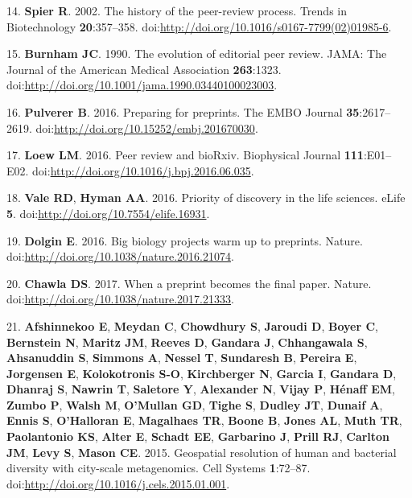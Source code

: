 \documentclass[11pt,]{article}
\begin{document}
14. \textbf{Spier R}. 2002. The history of the peer-review process.
Trends in Biotechnology \textbf{20}:357--358.
doi:\url{http://doi.org/10.1016/s0167-7799(02)01985-6}.

15. \textbf{Burnham JC}. 1990. The evolution of editorial peer review.
JAMA: The Journal of the American Medical Association \textbf{263}:1323.
doi:\url{http://doi.org/10.1001/jama.1990.03440100023003}.

16. \textbf{Pulverer B}. 2016. Preparing for preprints. The EMBO Journal
\textbf{35}:2617--2619.
doi:\url{http://doi.org/10.15252/embj.201670030}.

17. \textbf{Loew LM}. 2016. Peer review and bioRxiv. Biophysical Journal
\textbf{111}:E01--E02.
doi:\url{http://doi.org/10.1016/j.bpj.2016.06.035}.

18. \textbf{Vale RD}, \textbf{Hyman AA}. 2016. Priority of discovery in
the life sciences. eLife \textbf{5}.
doi:\url{http://doi.org/10.7554/elife.16931}.

19. \textbf{Dolgin E}. 2016. Big biology projects warm up to preprints.
Nature. doi:\url{http://doi.org/10.1038/nature.2016.21074}.

20. \textbf{Chawla DS}. 2017. When a preprint becomes the final paper.
Nature. doi:\url{http://doi.org/10.1038/nature.2017.21333}.

21. \textbf{Afshinnekoo E}, \textbf{Meydan C}, \textbf{Chowdhury S},
\textbf{Jaroudi D}, \textbf{Boyer C}, \textbf{Bernstein N},
\textbf{Maritz JM}, \textbf{Reeves D}, \textbf{Gandara J},
\textbf{Chhangawala S}, \textbf{Ahsanuddin S}, \textbf{Simmons A},
\textbf{Nessel T}, \textbf{Sundaresh B}, \textbf{Pereira E},
\textbf{Jorgensen E}, \textbf{Kolokotronis S-O}, \textbf{Kirchberger N},
\textbf{Garcia I}, \textbf{Gandara D}, \textbf{Dhanraj S},
\textbf{Nawrin T}, \textbf{Saletore Y}, \textbf{Alexander N},
\textbf{Vijay P}, \textbf{Hénaff EM}, \textbf{Zumbo P}, \textbf{Walsh
M}, \textbf{O'Mullan GD}, \textbf{Tighe S}, \textbf{Dudley JT},
\textbf{Dunaif A}, \textbf{Ennis S}, \textbf{O'Halloran E},
\textbf{Magalhaes TR}, \textbf{Boone B}, \textbf{Jones AL}, \textbf{Muth
TR}, \textbf{Paolantonio KS}, \textbf{Alter E}, \textbf{Schadt EE},
\textbf{Garbarino J}, \textbf{Prill RJ}, \textbf{Carlton JM},
\textbf{Levy S}, \textbf{Mason CE}. 2015. Geospatial resolution of human
and bacterial diversity with city-scale metagenomics. Cell Systems
\textbf{1}:72--87. doi:\url{http://doi.org/10.1016/j.cels.2015.01.001}.
\end{document}
